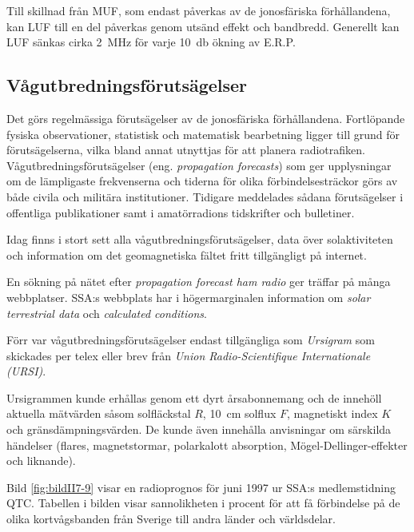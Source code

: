 Till skillnad från MUF, som endast påverkas av de jonosfäriska
förhållandena, kan LUF till en del påverkas genom utsänd effekt och bandbredd.
Generellt kan LUF sänkas cirka \SI{2}{\mega\hertz} för varje
\SI{10}{\decibel} ökning av E.R.P.

\subsection{Vågutbredningsförutsägelser}

Det görs regelmässiga förutsägelser av de jonosfäriska förhållandena.
Fortlöpande fysiska observationer, statistisk och matematisk bearbetning ligger
till grund för förutsägelserna, vilka bland annat utnyttjas för att planera
radiotrafiken.
Vågutbredningsförutsägelser (eng. \emph{propagation forecasts}) som ger
upplysningar om de lämpligaste frekvenserna och tiderna för olika
förbindelsesträckor görs av både civila och militära institutioner.
Tidigare meddelades sådana förutsägelser i offentliga publikationer samt i
amatörradions tidskrifter och bulletiner.

Idag finns i stort sett alla vågutbredningsförutsägelser, data över
solaktiviteten och information om det geomagnetiska fältet fritt tillgängligt på
internet.

En sökning på nätet efter \emph{propagation forecast ham radio} ger träffar på
många webbplatser.
SSA:s webbplats har i högermarginalen information om \emph{solar terrestrial data}
och \emph{calculated conditions}.

Förr var vågutbredningsförutsägelser endast tillgängliga som \emph{Ursigram} som
skickades per telex eller brev från \emph{Union Radio-Scientifique
Internationale (URSI)}.

Ursigrammen kunde erhållas genom ett dyrt årsabonnemang och de innehöll aktuella
mätvärden såsom solfläckstal \(R\), \SI{10}{\centi\metre} solflux \(F\),
magnetiskt index \(K\) och gränsdämpningsvärden.
De kunde även innehålla anvisningar om särskilda händelser (flares,
magnetstormar, polarkalott absorption, Mögel-Dellinger-effekter och liknande).

Bild \ref{fig:bildII7-9} visar en radioprognos för juni 1997 ur SSA:s
medlemstidning QTC.
Tabellen i bilden visar sannolikheten i procent för att få förbindelse på de
olika kortvågsbanden från Sverige till andra länder och världsdelar.

